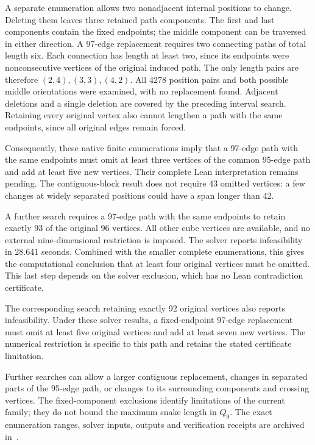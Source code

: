 \documentclass[11pt,a4paper]{article}
\theoremstyle{definition}
\theoremstyle{remark}
\begin{document}
A separate enumeration allows two nonadjacent internal positions to
change. Deleting them leaves three retained path components. The first
and last components contain the fixed endpoints; the middle component
can be traversed in either direction. A 97-edge replacement requires
two connecting paths of total length six. Each connection has length
at least two, since its endpoints were nonconsecutive vertices of the
original induced path. The only length pairs are therefore
$(2,4),(3,3),(4,2)$. All 4278 position pairs and both possible middle
orientations were examined, with no replacement found. Adjacent
deletions and a single deletion are covered by the preceding interval
search. Retaining every original vertex also cannot lengthen a path
with the same endpoints, since all original edges remain forced.

Consequently, these native finite enumerations imply that a 97-edge
path with the same endpoints must omit at least three vertices of the
common 95-edge path and add at least five new vertices. Their complete
Lean interpretation remains pending. The contiguous-block result
does not require 43 omitted vertices: a few changes at widely separated
positions could have a span longer than 42.

A further search requires a 97-edge path with the same endpoints
to retain exactly 93 of the original 96 vertices. All other cube vertices
are available, and no external nine-dimensional restriction is imposed.
The solver reports infeasibility in 28.641 seconds. Combined with the
smaller complete enumerations, this gives the computational conclusion
that at least four original vertices must be omitted. This last step
depends on the solver exclusion, which has no Lean contradiction
certificate.

The corresponding search retaining exactly 92 original vertices
also reports infeasibility. Under these solver results, a fixed-endpoint
97-edge replacement must omit at least five original vertices and add
at least seven new vertices. The numerical restriction is specific to
this path and retains the stated certificate limitation.


Further searches can allow a larger contiguous replacement, changes
in separated parts of the 95-edge path, or changes to its surrounding
components and crossing vertices. The fixed-component
exclusions identify limitations of the current family; they do not
bound the maximum snake length in $Q_9$. The exact enumeration ranges,
solver inputs, outputs and verification receipts are archived
in~\cite{replacement189archive}.
\end{document}
